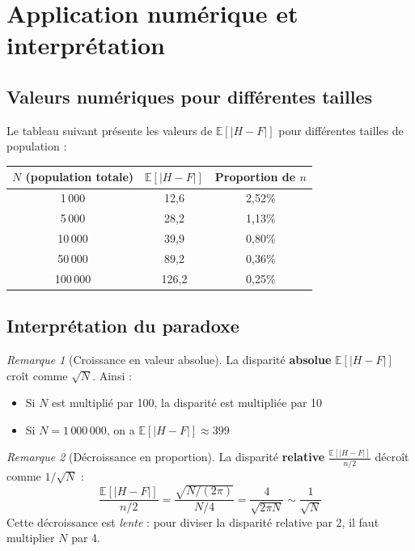 \documentclass[11pt,a4paper]{article}
\theoremstyle{definition}
\theoremstyle{remark}
\newtheorem{remark}{Remarque}
\begin{document}
\section{Application numérique et interprétation}

\subsection{Valeurs numériques pour différentes tailles}

Le tableau suivant présente les valeurs de $\mathbb{E}[|H-F|]$ pour différentes tailles de population :

\begin{center}
\begin{tabular}{|c|c|c|}
\hline
$N$ (population totale) & $\mathbb{E}[|H-F|]$ & Proportion de $n$ \\
\hline
1\,000 & 12,6 & 2,52\% \\
5\,000 & 28,2 & 1,13\% \\
10\,000 & 39,9 & 0,80\% \\
50\,000 & 89,2 & 0,36\% \\
100\,000 & 126,2 & 0,25\% \\
\hline
\end{tabular}
\end{center}

\subsection{Interprétation du paradoxe}

\begin{remark}[Croissance en valeur absolue]
La disparité \textbf{absolue} $\mathbb{E}[|H-F|]$ croît comme $\sqrt{N}$. Ainsi :
\begin{itemize}
    \item Si $N$ est multiplié par 100, la disparité est multipliée par 10
    \item Si $N = 1\,000\,000$, on a $\mathbb{E}[|H-F|] \approx 399$
\end{itemize}
\end{remark}

\begin{remark}[Décroissance en proportion]
La disparité \textbf{relative} $\frac{\mathbb{E}[|H-F|]}{n/2}$ décroît comme $1/\sqrt{N}$ :
\[
\frac{\mathbb{E}[|H-F|]}{n/2} = \frac{\sqrt{N/(2\pi)}}{N/4} = \frac{4}{\sqrt{2\pi N}} \sim \frac{1}{\sqrt{N}}
\]
Cette décroissance est \textit{lente} : pour diviser la disparité relative par 2, il faut multiplier $N$ par 4.
\end{remark}
\end{document}

